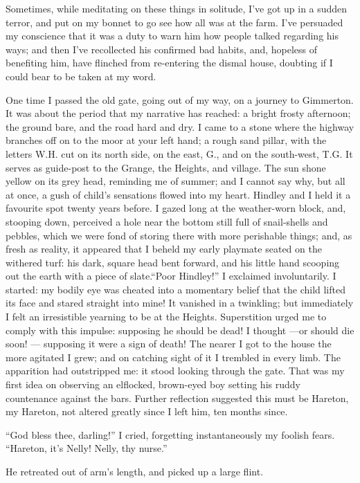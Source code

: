 \par Sometimes, while meditating on these things in solitude, I've got up in a sudden terror, and put on my bonnet to go see how all was at the farm. I've persuaded my conscience that it was a duty to warn him how people talked regarding his ways; and then I've recollected his confirmed bad habits, and, hopeless of benefiting him, have flinched from re-entering the dismal house, doubting if I could bear to be taken at my word.
\par One time I passed the old gate, going out of my way, on a journey to Gimmerton. It was about the period that my narrative has reached: a bright frosty afternoon; the ground bare, and the road hard and dry. I came to a stone where the highway branches off on to the moor at your left hand; a rough sand pillar, with the letters W.H. cut on its north side, on the east, G., and on the south-west, T.G. It serves as guide-post to the Grange, the Heights, and village. The sun shone yellow on its grey head, reminding me of summer; and I cannot say why, but all at once, a gush of child's sensations flowed into my heart. Hindley and I held it a favourite spot twenty years before. I gazed long at the weather-worn block, and, stooping down, perceived a hole near the bottom still full of snail-shells and pebbles, which we were fond of storing there with more perishable things; and, as fresh as reality, it appeared that I beheld my early playmate seated on the withered turf: his dark, square head bent forward, and his little hand scooping out the earth with a piece of slate.“Poor Hindley!” I exclaimed involuntarily. I started: my bodily eye was cheated into a momentary belief that the child lifted its face and stared straight into mine! It vanished in a twinkling; but immediately I felt an irresistible yearning to be at the Heights. Superstition urged me to comply with this impulse: supposing he should be dead! I thought —or should die soon! — supposing it were a sign of death! The nearer I got to the house the more agitated I grew; and on catching sight of it I trembled in every limb. The apparition had outstripped me: it stood looking through the gate. That was my first idea on observing an elflocked, brown-eyed boy setting his ruddy countenance against the bars. Further reflection suggested this must be Hareton, my Hareton, not altered greatly since I left him, ten months since.
\par “God bless thee, darling!” I cried, forgetting instantaneously my foolish fears. “Hareton, it's Nelly! Nelly, thy nurse.”
\par He retreated out of arm's length, and picked up a large flint.
